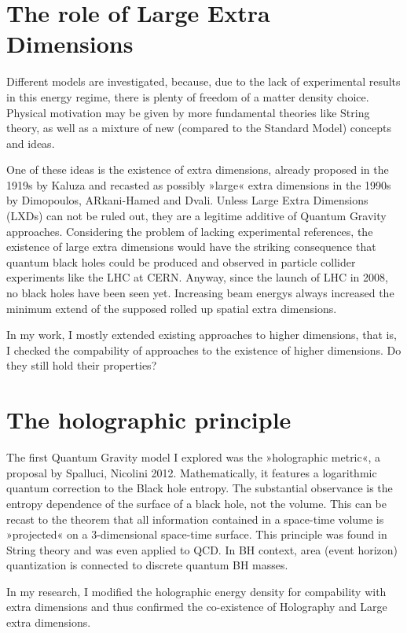 \documentclass[10pt,a4paper, fleqn]{article}
\begin{document}
\section*{The role of Large Extra Dimensions}
Different models are investigated, because, due to the lack of experimental results in this energy regime, there is plenty of freedom of a matter density choice. Physical motivation may be given by more fundamental theories like String theory, as well as a mixture of new (compared to the Standard Model) concepts and ideas.

One of these ideas is the existence of extra dimensions, already proposed in the 1919s by Kaluza and recasted as possibly »large« extra dimensions in the 1990s by Dimopoulos, ARkani-Hamed and Dvali. Unless Large Extra Dimensions (LXDs) can not be ruled out, they are a legitime additive of Quantum Gravity approaches. Considering the problem of lacking experimental references, the existence of large extra dimensions would have the striking consequence that quantum black holes could be produced and observed in particle collider experiments like the LHC at CERN. Anyway, since the launch of LHC in 2008, no black holes have been seen yet. Increasing beam energys always increased the minimum extend of the supposed rolled up spatial extra dimensions.

In my work, I mostly extended existing approaches to higher dimensions, that is, I checked the compability of approaches to the existence of higher dimensions. Do they still hold their properties?

\section*{The holographic principle}
The first Quantum Gravity model I explored was the »holographic metric«, a proposal by Spalluci, Nicolini 2012. Mathematically, it features a logarithmic quantum correction to the Black hole entropy. The substantial observance is the entropy dependence of the surface of a black hole, not the volume. This can be recast to the theorem that all information contained in a space-time volume is »projected« on a 3-dimensional space-time surface. This principle was found in String theory and was even applied to QCD. In BH context, area (event horizon) quantization is connected to discrete quantum BH masses.%

In my research, I modified the holographic energy density for compability with extra dimensions and thus confirmed the co-existence of Holography and Large extra dimensions.
\end{document}
